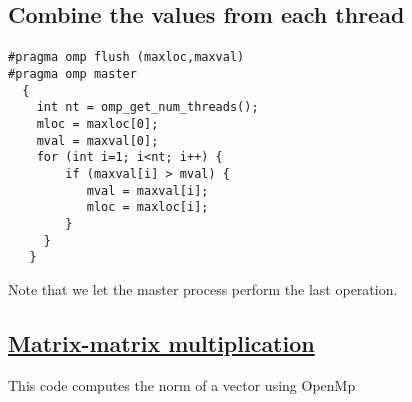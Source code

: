 \documentclass[%
oneside,                 %
final,                   %
10pt]{article}
\begin{document}
\subsection*{Combine the values from each thread}

\paragraph{}














\begin{verbatim}
#pragma omp flush (maxloc,maxval)
#pragma omp master
  {
    int nt = omp_get_num_threads(); 
    mloc = maxloc[0]; 
    mval = maxval[0]; 
    for (int i=1; i<nt; i++) {
        if (maxval[i] > mval) { 
           mval = maxval[i]; 
           mloc = maxloc[i];
        } 
     }
   }

\end{verbatim}

Note that we let the master process perform the last operation.


\subsection*{\href{{https://github.com/CompPhysics/ComputationalPhysicsMSU/blob/master/doc/Programs/ParallelizationOpenMP/OpenMPvectornorm.cpp}}{Matrix-matrix multiplication}}
This code computes the norm of a vector using OpenMp
\end{document}
